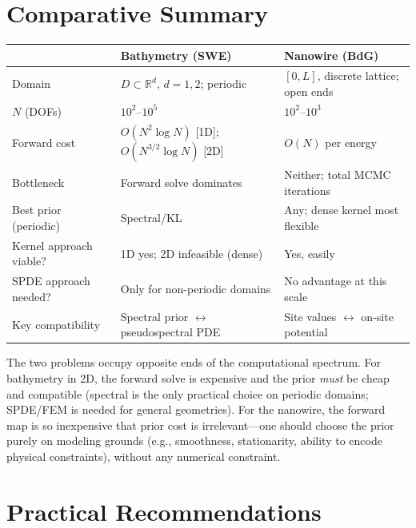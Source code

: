 \documentclass[11pt]{article}
\newcommand{\R}{\mathbb{R}}
\begin{document}
\section{Comparative Summary}\label{sec:summary}

\begin{center}
\renewcommand{\arraystretch}{1.3}
\begin{tabular}{@{}p{3cm}p{5.5cm}p{5.5cm}@{}}
\toprule
& \textbf{Bathymetry (SWE)} & \textbf{Nanowire (BdG)} \\
\midrule
Domain & $D \subset \R^d$, $d = 1,2$; periodic & $[0,L]$, discrete lattice; open ends \\
$N$ (DOFs) & $10^2$--$10^5$ & $10^2$--$10^3$ \\
Forward cost & $O(N^2 \log N)$ [1D]; $O(N^{3/2}\log N)$ [2D] & $O(N)$ per energy \\
Bottleneck & Forward solve dominates & Neither; total MCMC iterations \\
Best prior (periodic) & Spectral/KL & Any; dense kernel most flexible \\
Kernel approach viable? & 1D yes; 2D infeasible (dense) & Yes, easily \\
SPDE approach needed? & Only for non-periodic domains & No advantage at this scale \\
Key compatibility & Spectral prior $\leftrightarrow$ pseudospectral PDE & Site values $\leftrightarrow$ on-site potential \\
\bottomrule
\end{tabular}
\end{center}

\medskip
The two problems occupy opposite ends of the computational spectrum.  For bathymetry in 2D, the forward solve is expensive and the prior \emph{must} be cheap and compatible (spectral is the only practical choice on periodic domains; SPDE/FEM is needed for general geometries).  For the nanowire, the forward map is so inexpensive that prior cost is irrelevant---one should choose the prior purely on modeling grounds (e.g., smoothness, stationarity, ability to encode physical constraints), without any numerical constraint.


\section{Practical Recommendations}\label{sec:recommendations}
\end{document}
